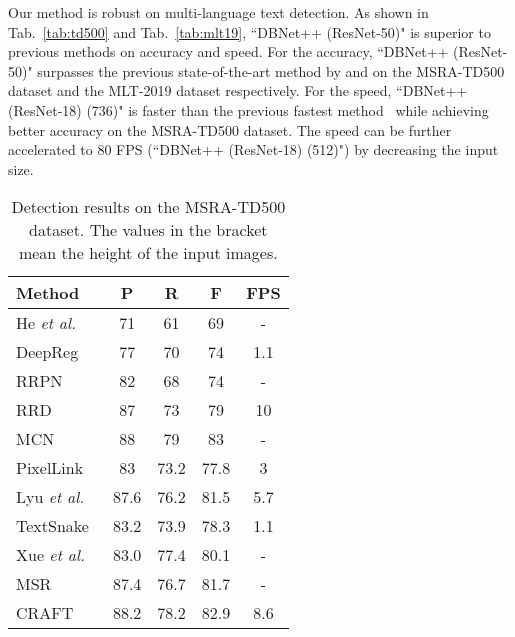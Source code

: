 Our method is robust on multi-language text detection. As shown in Tab.~\ref{tab:td500} and Tab.~\ref{tab:mlt19}, ``DBNet++ (ResNet-50)" is superior to previous methods on accuracy and speed. For the accuracy, ``DBNet++ (ResNet-50)" surpasses the previous state-of-the-art method by  and  on the MSRA-TD500 dataset and the MLT-2019 dataset respectively. For the speed, ``DBNet++ (ResNet-18) (736)" is faster than the previous fastest method~\cite{wang2019efficient} while achieving better accuracy on the MSRA-TD500 dataset. The speed can be further accelerated to 80 FPS (``DBNet++ (ResNet-18) (512)") by decreasing the input size.

\begin{table}[ht]
\setlength{\tabcolsep}{10.0pt}
\centering
\caption{Detection results on the MSRA-TD500 dataset. The values in the bracket mean the height of the input images.}
\begin{tabularx}{1.0\linewidth}{lc*{3}c}
\toprule
Method        & P             & R             & F             & FPS         \\ \midrule
He \textit{et al.}~\cite{he2016text}          & 71            & 61            & 69            & -         \\ 
DeepReg~\cite{deepdirect}       & 77            & 70            & 74            & 1.1         \\ 
RRPN~\cite{rrpn}          & 82            & 68            & 74            & -         \\ 
RRD~\cite{liao2018rotation}           & 87            & 73            & 79            & 10          \\ 
MCN~\cite{mcn}          & 88            & 79            & 83            & -         \\ 
PixelLink~\cite{deng2018pixellink}     & 83            & 73.2          & 77.8          & 3           \\ 
Lyu \textit{et al.}~\cite{lyu2018multi}    & 87.6          & 76.2          & 81.5          & 5.7         \\ 
TextSnake~\cite{long2018textsnake}     & 83.2          & 73.9          & 78.3          & 1.1         \\ 
Xue \textit{et al.}~\cite{xue2018accurate}         & 83.0          & 77.4          & 80.1          & -       \\ 
MSR~\cite{MSR}     & 87.4          & 76.7          & 81.7          & -       \\   
CRAFT~\cite{craft}         & 88.2          & 78.2          & 82.9          & 8.6       \\ 

\end{tabularx}
\end{table}
